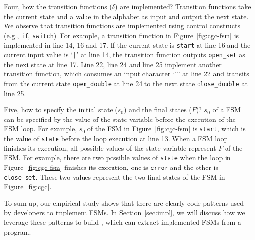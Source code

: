 Four, how the transition functions ($\delta$) are implemented?
Transition functions take the current state and a value
in the alphabet as input and output the next state. 
We observe that transition functions are implemented
using control constructs (e.g., \texttt{if}, \texttt{switch}). 
For example, a transition function in Figure~\ref{fig:cgc-fsm} 
is implemented in line 14, 16 and 17. 
If the current state is \texttt{start} at line 16 and the current input value is 
`\verb/|/’ at line 14, the transition function outputs \texttt{open\_set}
as the next state at line 17. 
Line 22, line 24 and line 25 implement another transition function,
which consumes an input character `''' at line 22 and 
transits from the current state 
\texttt{open\_double} at line 24 to 
the next state \texttt{close\_double} at line 25. 


Five, how to specify the initial state ($s_0$) and the final states ($F$)? 
$s_0$ of a FSM can be specified 
by the value of the state variable before the execution of the FSM loop.
For example,  $s_0$ of the FSM in Figure~\ref{fig:cgc-fsm}
is \texttt{start}, which is the value of \texttt{state} 
before the loop execution at line 13. 
When a FSM loop finishes its execution, 
all possible values of the state variable
represent $F$ of the FSM. 
For example, there are two possible values of \texttt{state} when 
the loop in Figure~\ref{fig:cgc-fsm} finishes its execution, 
one is \texttt{error} and the other is \texttt{close\_set}.
These two values represent the two final states of 
the FSM in Figure~\ref{fig:cgc}.

To sum up, our empirical study shows that 
there are clearly code patterns used by developers to implement FSMs. 
In Section~\ref{sec:impl}, we will discuss how we 
leverage these patterns to build \Tool{}, 
which can extract implemented FSMs from a program. 




